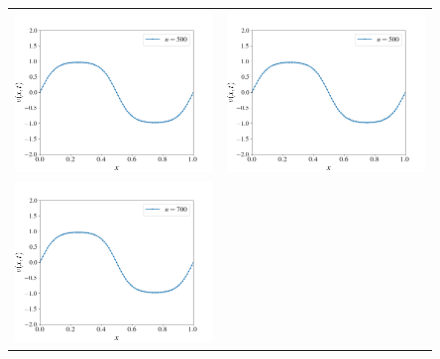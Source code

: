 \documentclass[12pt, reqno]{report}
\theoremstyle{definition}
\theoremstyle{remark}
\begin{document}
\begin{figure}[H]
\begin{tabular}{cc}
        \includegraphics[width=\acfdwidth]{media_paper/stable_AC_FD_500} & 
        \includegraphics[width=\acfdwidth]{media_paper/unstable_AC_FD_500} \\
        \includegraphics[width=\acfdwidth]{media_paper/stable_AC_FD_700} & 

\end{tabular}
\end{figure}
\end{document}
